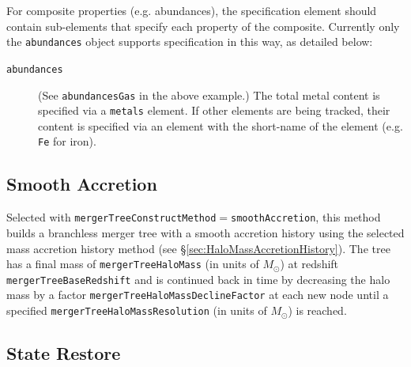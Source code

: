 For composite properties (e.g. abundances), the specification element should contain sub-elements that specify each property of the composite. Currently only the {\tt abundances} object supports specification in this way, as detailed below:
\begin{description}
 \item [{\tt abundances}] (See {\tt abundancesGas} in the above example.) The total metal content is specified via a {\tt metals} element. If other elements are being tracked, their content is specified via an element with the short-name of the element (e.g. {\tt Fe} for iron).
\end{description}

\subsection{Smooth Accretion}\label{sec:SmoothAccretion}

Selected with {\tt mergerTreeConstructMethod}$=${\tt smoothAccretion}, this method builds a branchless merger tree with a smooth accretion history using the selected mass accretion history method (see \S\ref{sec:HaloMassAccretionHistory}). The tree has a final mass of {\tt mergerTreeHaloMass} (in units of $M_\odot$) at redshift {\tt mergerTreeBaseRedshift} and is continued back in time by decreasing the halo mass by a factor {\tt mergerTreeHaloMassDeclineFactor} at each new \gls{node} until a specified {\tt mergerTreeHaloMassResolution} (in units of $M_\odot$) is reached.

\subsection{State Restore}\label{sec:TreeConstructStateRestore}

